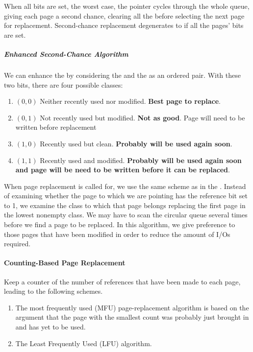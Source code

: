 When all bits are set, the worst case, the pointer cycles through the whole queue, giving each page a second chance, clearing all the  before selecting the next page for replacement.
Second-chance replacement degenerates to  if all the pages' bits are set.

\subparagraph{Enhanced Second-Chance Algorithm}\label{subpar:Enhanced_Second_Chance_Algorithm}
We can enhance the  by considering the  and the  as an ordered pair.
With these two bits, there are four possible classes:
\begin{enumerate}[noitemsep]
\item $(0, 0)$ Neither recently used nor modified. \textbf{Best page to replace}.
\item $(0, 1)$ Not recently used but modified. \textbf{Not as good}. Page will need to be written before replacement
\item $(1, 0)$ Recently used but clean. \textbf{Probably will be used again soon}.
\item $(1, 1)$ Recently used and modified. \textbf{Probably will be used again soon and page will be need to be written before it can be replaced}.
\end{enumerate}

When page replacement is called for, we use the same scheme as in the .
Instead of examining whether the page to which we are pointing has the reference bit set to 1, we examine the class to which that page belongs replacing the first page in the lowest nonempty class.
We may have to scan the circular queue several times before we find a page to be replaced.
In this algorithm, we give preference to those pages that have been modified in order to reduce the amount of I/Os required.

\paragraph{Counting-Based Page Replacement}\label{par:Counting_Page_Replacement}
Keep a counter of the number of references that have been made to each page, leading to the following schemes.
\begin{enumerate}[noitemsep]
\item The most frequently used (MFU) page-replacement algorithm is based on the argument that the page with the smallest count was probably just brought in and has yet to be used.
\item The Least Frequently Used (LFU)  algorithm.
\end{enumerate}



